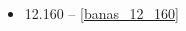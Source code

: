 \begin{multicols}{3}
\begin{itemize}
    \item 12.160 -- \ref{banas_12_160}

\end{itemize}
\end{multicols}
